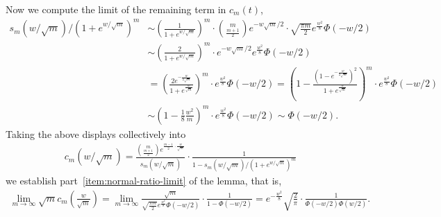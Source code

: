 \documentclass[11pt]{article}
\newcommand{\prn}[1]{\left({#1}\right)} %
\newcommand{\<}{\langle} %
\renewcommand{\>}{\rangle}
\begin{document}
%
Now we compute the limit of the remaining term in $c_m(t)$,
\begin{align*}
	s_m(w/\sqrt{m})/(1+e^{w/\sqrt{m}})^m & \sim \prn{\frac{1}{1 + e^{w/\sqrt{m}}}}^m  \cdot \binom{m}{\frac{m+1}{2}} e^{-w \sqrt{m}/2} \cdot \sqrt{\frac{ \pi m}{2}} e^{\frac{w^2}{8}} \Phi(-w/2) \nonumber \\
	& \sim \prn{\frac{2}{1 + e^{w/\sqrt{m}}}}^m \cdot  e^{-w\sqrt{m}/2} e^{\frac{w^2}{8}} \Phi(-w/2) \nonumber \\
	& =  \prn{\frac{2 e^{-\frac{w}{2\sqrt{m}}}}{1 + e^{\frac{w}{\sqrt{m}}}}}^m \cdot e^{\frac{w^2}{8}} \Phi(-w/2) = \prn{1 - \frac{\prn{1 - e^{-\frac{w}{2\sqrt{m}}}}^2}{1 + e^{\frac{w}{\sqrt{m}}}}}^m \cdot e^{\frac{w^2}{8}} \Phi(-w/2) \nonumber \\
	& \sim \prn{1 - \frac{1}{8} \frac{w^2}{m}}^m \cdot e^{\frac{w^2}{8}} \Phi(-w/2) \sim  \Phi(-w/2).
\end{align*}
Taking the above displays collectively into
\begin{align*}
	c_m(w/\sqrt{m}) = \frac{\binom{m}{\frac{m+1}{2}} e^{\frac{m-1}{2}\cdot \frac{w}{\sqrt{m}}}}{s_m(w/\sqrt{m})} \cdot \frac{1}{1 - s_m(w/\sqrt{m})/(1+e^{w/\sqrt{m}})^m}
\end{align*}
we establish part~\ref{item:normal-ratio-limit} of the lemma, that is,
\begin{align*}
	\lim_{m \to \infty} \sqrt{m} c_m \prn{\frac{w}{\sqrt{m}}} = \lim_{m \to \infty} \frac{\sqrt{m}}{\sqrt{\frac{ \pi m}{2}} e^{\frac{w^2}{8}} \Phi(-w/2)} \cdot \frac{1}{1 - \Phi(-w/2)} = e^{-\frac{w^2}{8}} \sqrt{\frac{2}{\pi}} \cdot \frac{1}{\Phi(-w/2) \Phi(w/2)}.
\end{align*}
\end{document}
